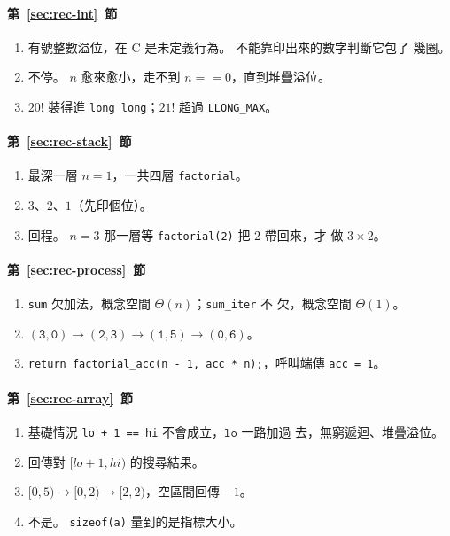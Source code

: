 \paragraph{第~\ref{sec:rec-int}~節}
\begin{enumerate}
\item 有號整數溢位，在 C 是未定義行為。 不能靠印出來的數字判斷它包了
幾圈。
\item 不停。 $n$ 愈來愈小，走不到 $n == 0$，直到堆疊溢位。
\item $20!$ 裝得進 \texttt{long long}；$21!$ 超過 \texttt{LLONG\_MAX}。
\end{enumerate}

\paragraph{第~\ref{sec:rec-stack}~節}
\begin{enumerate}
\item 最深一層 $n = 1$，一共四層 \texttt{factorial}。
\item $3$、$2$、$1$（先印個位）。
\item 回程。 $n = 3$ 那一層等 \texttt{factorial(2)} 把 $2$ 帶回來，才
做 $3 \times 2$。
\end{enumerate}

\paragraph{第~\ref{sec:rec-process}~節}
\begin{enumerate}
\item \texttt{sum} 欠加法，概念空間 $\Theta(n)$；\texttt{sum\_iter} 不
欠，概念空間 $\Theta(1)$。
\item $(\texttt{3},\texttt{0}) \rightarrow (\texttt{2},\texttt{3})
\rightarrow (\texttt{1},\texttt{5}) \rightarrow (\texttt{0},\texttt{6})$。
\item \texttt{return factorial\_acc(n - 1, acc * n);}，呼叫端傳
\texttt{acc = 1}。
\end{enumerate}

\paragraph{第~\ref{sec:rec-array}~節}
\begin{enumerate}
\item 基礎情況 \texttt{lo + 1 == hi} 不會成立，$\texttt{lo}$ 一路加過
去，無窮遞迴、堆疊溢位。
\item 回傳對 $[lo+1, hi)$ 的搜尋結果。
\item $[0, 5) \rightarrow [0, 2) \rightarrow [2, 2)$，空區間回傳 $-1$。
\item 不是。 \texttt{sizeof(a)} 量到的是指標大小。
\end{enumerate}

